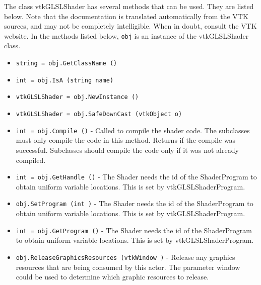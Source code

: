 The class vtkGLSLShader has several methods that can be used.
  They are listed below.
Note that the documentation is translated automatically from the VTK sources,
and may not be completely intelligible.  When in doubt, consult the VTK website.
In the methods listed below, \verb|obj| is an instance of the vtkGLSLShader class.
\begin{itemize}
\item  \verb|string = obj.GetClassName ()|

\item  \verb|int = obj.IsA (string name)|

\item  \verb|vtkGLSLShader = obj.NewInstance ()|

\item  \verb|vtkGLSLShader = obj.SafeDownCast (vtkObject o)|

\item  \verb|int = obj.Compile ()| -  Called to compile the shader code.
 The subclasses must only compile the code in this method.
 Returns if the compile was successful.
 Subclasses should compile the code only if it was not
 already compiled.

\item  \verb|int = obj.GetHandle ()| -  The Shader needs the id of the ShaderProgram
 to obtain uniform variable locations. This is set
 by vtkGLSLShaderProgram.

\item  \verb|obj.SetProgram (int )| -  The Shader needs the id of the ShaderProgram
 to obtain uniform variable locations. This is set
 by vtkGLSLShaderProgram.

\item  \verb|int = obj.GetProgram ()| -  The Shader needs the id of the ShaderProgram
 to obtain uniform variable locations. This is set
 by vtkGLSLShaderProgram.

\item  \verb|obj.ReleaseGraphicsResources (vtkWindow )| -  Release any graphics resources that are being consumed by this actor.
 The parameter window could be used to determine which graphic
 resources to release.

\end{itemize}
